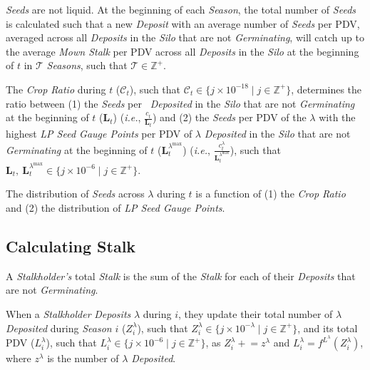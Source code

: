 \documentclass[tikz]{article}
\newcommand{\term}[1]{\textsl{#1}}
\newcommand{\Pinto}{} %
\newcommand{\pinto}{} %
\begin{document}
\term{Seeds} are not liquid. At the beginning of each \term{Season}, the total number of \term{Seeds} is calculated such that a new \term{Deposit} with an average number of \term{Seeds} per PDV, averaged across all \term{Deposits} in the \term{Silo} that are not \term{Germinating}, will catch up to the average \term{Mown Stalk} per PDV across all \term{Deposits} in the \term{Silo} at the beginning of $t$ in $\mathscr{T}$ \term{Seasons}, such that $\mathscr{T}\in \mathbb{Z}^{+}$.

The \term{Crop Ratio} during $t$ ($\mathscr{C}_{t}$), such that $\mathscr{C}_{t} \in \{j \times 10^{-18} \mid j \in \mathbb{Z}^{+} \}$, determines the ratio between (1) the \term{Seeds} per \Pinto\ \term{Deposited} in the \term{Silo} that are not \term{Germinating} at the beginning of $t$ ($\mathbf{L}_{t}^{\pinto}$) (\textit{i.e.}, $\frac{c_{t}^{\pinto}}{\mathbf{L}_{t}^{\pinto}}$) and (2) the \term{Seeds} per PDV of the $\lambda$ with the highest \term{LP Seed Gauge Points} per PDV of $\lambda$ \term{Deposited} in the \term{Silo} that are not \term{Germinating} at the beginning of $t$ ($\mathbf{L}_{t}^{\lambda^{\text{max}}}$) (\textit{i.e.}, $\frac{c_{t}^{\lambda}}{\mathbf{L}_{t}^{\lambda^{\text{max}}}}$), such that $\mathbf{L}_{t}^{\pinto},\ \mathbf{L}_{t}^{\lambda^{\text{max}}} \in \{j \times 10^{-6} \mid j \in \mathbb{Z}^{+} \}$.

The distribution of \term{Seeds} across $\lambda$ during $t$ is a function of (1) the \term{Crop Ratio} and (2) the distribution of \term{LP Seed Gauge Points}.


\vspace*{-1mm}
\subsection{Calculating Stalk}
\vspace*{-1mm}

A \term{Stalkholder's} total \term{Stalk} is the sum of the \term{Stalk} for each of their \term{Deposits} that are not \term{Germinating}.

When a \term{Stalkholder} \term{Deposits} $\lambda$ during $i$, they update their total number of $\lambda$ \term{Deposited} during \term{Season} $i$ ($Z_{i}^{\lambda}$), such that $Z_{i}^{\lambda} \in \{j \times 10^{-\lambda} \mid j \in \mathbb{Z}^{+} \}$,  and its total PDV ($L_{i}^{\lambda}$), such that $L_{i}^{\lambda} \in \{j \times 10^{-6} \mid j \in \mathbb{Z}^{+} \}$, as $Z_{i}^{\lambda} \mathrel{+}= z^{\lambda}$ and $L_{i}^{\lambda} \mathrel= f^{L^{\lambda}}(Z_{i}^{\lambda})$, where $z^{\lambda}$ is the number of $\lambda$ \term{Deposited}. 
\end{document}
